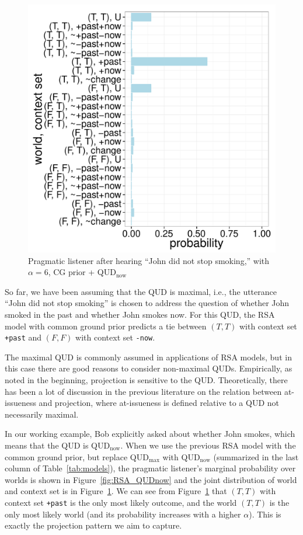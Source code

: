 \begin{figure}
 \includegraphics[scale=0.48]{figs/joint_CGprior_QUDnow.pdf}
 \caption{Pragmatic listener after hearing ``John did not stop smoking,'' with $\alpha=6$, CG prior + QUD$_\text{now}$\label{fig:joint-QUDnow}}
\end{figure}

So far, we have been assuming that the QUD is maximal, i.e., the utterance 
 ``John did not stop smoking'' is chosen to address the question of
 whether John smoked in the past and whether John smokes now.
For this QUD, the RSA model with common ground prior predicts a tie between 
 $(T, T)$ with context set \verb=+past= and
 $(F, F)$ with context set \verb=-now=.
 
The maximal QUD is commonly assumed in applications of RSA models, but 
 in this case there are good reasons to consider non-maximal QUDs.
Empirically, as noted in the beginning, projection is sensitive to the QUD.
Theoretically, there has been a lot of discussion in the previous literature
 \cite{Beaver2010:Have-You-Noticed, SimonsEtAl2001:What-Projects-and-Why} on the relation between at-issueness and projection, where at-issueness is defined 
 relative to a QUD not necessarily maximal.
 
In our working example, Bob explicitly asked about whether John smokes, 
 which means that the QUD is QUD$_\textrm{now}$.
When we use the previous RSA model with the common ground prior, but  
 replace QUD$_\textrm{max}$ with QUD$_\textrm{now}$ (summarized in the 
 last column of Table~\ref{tab:models}), the pragmatic listener's marginal probability over worlds is shown in Figure~\ref{fig:RSA_QUDnow} and the joint
 distribution of world and context set is in Figure~\ref{fig:joint-QUDnow}.
We can see from Figure~\ref{fig:joint-QUDnow} that $(T, T)$ with context set
 \verb=+past= is 
 the only most likely outcome, and the world $(T, T)$ is the 
 only most likely world (and its probability increases with a higher $\alpha$).
This is exactly the projection pattern we aim to capture.

